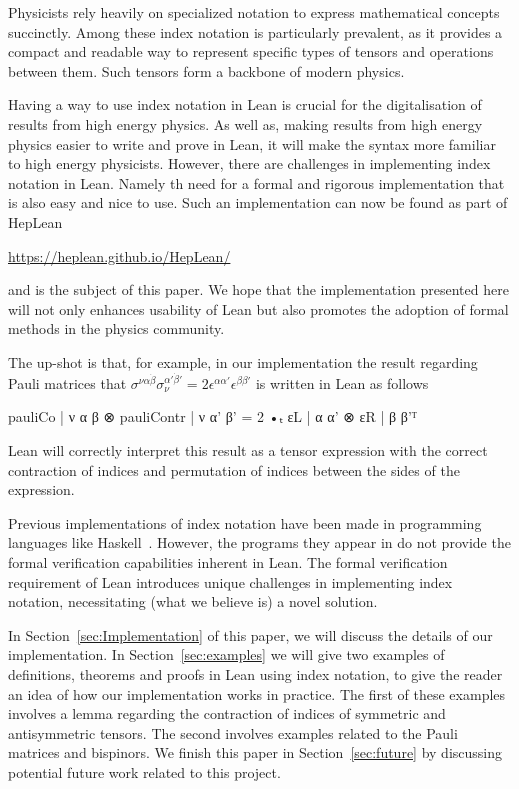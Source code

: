 \documentclass[a4paper, 11pt]{article}
\begin{document}
Physicists rely heavily on specialized notation to express mathematical concepts succinctly. 
Among these index notation is particularly prevalent,
 as it provides a compact and readable way to represent specific types of tensors and operations
 between them. Such tensors form a backbone of modern physics. 

Having a way to use index notation in Lean is crucial for the digitalisation of 
results from high energy physics. 
As well as, making results from high energy physics easier to write and prove in Lean, 
it will make the syntax more familiar to high energy physicists.
However, there are challenges in implementing index notation in Lean.
Namely th need for a formal and rigorous implementation that is also easy and nice to use. 
Such an implementation can now be found as part of HepLean 
\begin{center}
\url{https://heplean.github.io/HepLean/}
\end{center}
and is the subject of this paper.
We hope that the implementation presented here will
not only enhances usability of Lean but also promotes the adoption of formal methods in the 
physics community.

The up-shot is that, for example, in our implementation the result regarding Pauli matrices 
that $\sigma^{\nu \alpha \dot \beta}\sigma_\nu^{ \alpha' \dot \beta'} = 2 \epsilon^{\alpha \alpha'}\epsilon^{\beta \beta'}$ 
is written in Lean as follows
\begin{code}
{pauliCo | ν α β ⊗ pauliContr | ν α' β' = 2 •ₜ εL | α α' ⊗ εR | β β'}ᵀ
\end{code}
Lean will correctly interpret this result as a tensor expression with the correct contraction of indices 
and permutation of indices between the sides of the expression.

Previous implementations of index notation have been made in programming languages like Haskell~\cite{haskellPaper}. However, the programs they appear in do not
 provide the formal verification capabilities inherent in Lean. 
 The formal verification requirement of Lean introduces unique challenges in implementing index 
 notation, necessitating (what we believe is) a novel solution.

In Section~\ref{sec:Implementation} of this paper, we will discuss the details of our implementation. 
In Section~\ref{sec:examples} we will give two examples of definitions, theorems and proofs in Lean using index notation, 
to give the reader an idea of how our implementation works in practice.
The first of these examples involves a lemma regarding the contraction of indices of symmetric and antisymmetric tensors. 
The second involves examples related to the Pauli matrices and bispinors. 
We finish this paper in Section~\ref{sec:future} by discussing potential future work related to this project.
\end{document}
